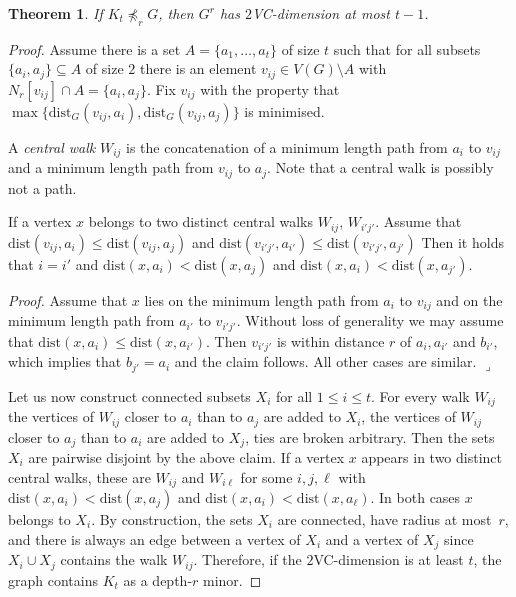 \documentclass[11pt, fleqn]{article}
\theoremstyle{plain}
\newtheorem{theorem}{Theorem}
\theoremstyle{nonumberplain}
\newtheorem{proof}{Proof.}
\newcommand{\minor}{\preccurlyeq}
\newcommand{\dist}{\mathrm{dist}}
\begin{document}
\begin{theorem}
If $K_t\not\minor_rG$, then 
$G^r$ has $2$VC-dimension at most $t-1$. 
\end{theorem}
\begin{proof}
Assume there is a set $A=\{a_1,\ldots, a_t\}$ of size $t$ such that
for all subsets $\{a_i,a_j\}\subseteq A$ of size $2$ 
there is an element $v_{ij}\in V(G)\setminus A$ with 
$N_r[v_{ij}]\cap A=\{a_i,a_j\}$. Fix $v_{ij}$ with the property
that $\max\{\dist_G(v_{ij},a_i), \dist_G(v_{ij},a_j)\}$ is 
minimised. 

A \emph{central walk} $W_{ij}$ is the concatenation of a minimum length
path from $a_i$ to $v_{ij}$ and a minimum length path from $v_{ij}$ to $a_j$. 
Note that a central walk is possibly not a path. 

\begin{claim}
If a vertex $x$ belongs to two distinct central walks $W_{ij}$, $W_{i'j'}$. 
Assume that $\dist(v_{ij}, a_i)\leq \dist(v_{ij},a_j)$ and 
$\dist(v_{i'j'}, a_{i'})\leq \dist(v_{i'j'},a_{j'})$
Then it holds that $i=i'$ and
$\dist(x,a_i)< \dist(x,a_j)$ and $\dist(x,a_i)<\dist(x,a_{j'})$. 
\end{claim}
\noindent\textit{Proof.} Assume that $x$ lies on the minimum length path
from $a_i$ to $v_{ij}$ and on the minimum length path from $a_{i'}$ to 
$v_{i'j'}$. Without loss of generality we may assume that 
$\dist(x,a_i)\leq \dist(x,a_{i'})$. Then $v_{i'j'}$ is within distance $r$ of
$a_i,a_{i'}$ and $b_{i'}$, which implies that $b_{j'}=a_{i}$ and the claim follows.  
All other cases are similar. 
%
%
%
\hfill$\lrcorner$

\bigskip
Let us now construct connected subsets $X_i$ for all $1\leq i\leq t$. 
For every walk $W_{ij}$ the vertices of $W_{ij}$ closer to $a_i$ than to $a_j$ 
are added to $X_i$, the vertices of $W_{ij}$ closer to $a_j$ than to $a_i$ 
are added to $X_j$, ties are broken arbitrary.
Then the sets $X_i$ are pairwise disjoint by the above claim. If a vertex $x$
appears in two distinct central walks, these are $W_{ij}$ and $W_{i\ell}$ for some
$i,j,\ell$ with $\dist(x,a_i)<\dist(x,a_j)$ and $\dist(x,a_i)<\dist(x,a_\ell)$. 
In both cases $x$ belongs to $X_i$. By construction, the sets $X_i$ are connected, 
have radius at most~$r$, and 
there is always an edge between a vertex of $X_i$ and a vertex of $X_j$ since $X_i\cup X_j$ 
contains the walk $W_{ij}$. Therefore, if the $2$VC-dimension is at least $t$, the 
graph contains $K_t$ as a depth-$r$ minor. 
\end{proof}


 
\end{document}
